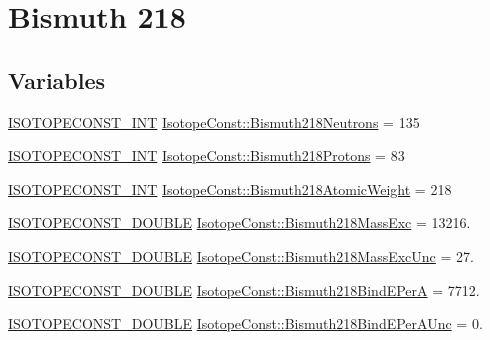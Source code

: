 \hypertarget{group___isotope_const-_bismuth-_bi218}{}\section{Bismuth 218}
\label{group___isotope_const-_bismuth-_bi218}
\subsection*{Variables}
\begin{DoxyCompactItemize}
\item 
\mbox{\hyperlink{group___isotope_const-_macros_ga5f18360b3e99483a35c32d789e62621c}{I\+S\+O\+T\+O\+P\+E\+C\+O\+N\+S\+T\+\_\+\+I\+NT}} \mbox{\hyperlink{group___isotope_const-_bismuth-_bi218_ga3a7dd1d83a43975898d46192b9614994}{Isotope\+Const\+::\+Bismuth218\+Neutrons}} = 135
\item 
\mbox{\hyperlink{group___isotope_const-_macros_ga5f18360b3e99483a35c32d789e62621c}{I\+S\+O\+T\+O\+P\+E\+C\+O\+N\+S\+T\+\_\+\+I\+NT}} \mbox{\hyperlink{group___isotope_const-_bismuth-_bi218_ga99e855b494cd6569161abd1d37eeb29c}{Isotope\+Const\+::\+Bismuth218\+Protons}} = 83
\item 
\mbox{\hyperlink{group___isotope_const-_macros_ga5f18360b3e99483a35c32d789e62621c}{I\+S\+O\+T\+O\+P\+E\+C\+O\+N\+S\+T\+\_\+\+I\+NT}} \mbox{\hyperlink{group___isotope_const-_bismuth-_bi218_ga82c41bd63224026872a147982b7467b9}{Isotope\+Const\+::\+Bismuth218\+Atomic\+Weight}} = 218
\item 
\mbox{\hyperlink{group___isotope_const-_macros_ga8f45a7272ce02c0b4c65c44636ed719a}{I\+S\+O\+T\+O\+P\+E\+C\+O\+N\+S\+T\+\_\+\+D\+O\+U\+B\+LE}} \mbox{\hyperlink{group___isotope_const-_bismuth-_bi218_ga25d8012733a8e12573b42ecfd4c5728d}{Isotope\+Const\+::\+Bismuth218\+Mass\+Exc}} = 13216.
\item 
\mbox{\hyperlink{group___isotope_const-_macros_ga8f45a7272ce02c0b4c65c44636ed719a}{I\+S\+O\+T\+O\+P\+E\+C\+O\+N\+S\+T\+\_\+\+D\+O\+U\+B\+LE}} \mbox{\hyperlink{group___isotope_const-_bismuth-_bi218_ga4d3baf2e524adeb05322dc3b745c0e20}{Isotope\+Const\+::\+Bismuth218\+Mass\+Exc\+Unc}} = 27.
\item 
\mbox{\hyperlink{group___isotope_const-_macros_ga8f45a7272ce02c0b4c65c44636ed719a}{I\+S\+O\+T\+O\+P\+E\+C\+O\+N\+S\+T\+\_\+\+D\+O\+U\+B\+LE}} \mbox{\hyperlink{group___isotope_const-_bismuth-_bi218_ga2d0d65d8119471e1149da3408f01f0f0}{Isotope\+Const\+::\+Bismuth218\+Bind\+E\+PerA}} = 7712.
\item 
\mbox{\hyperlink{group___isotope_const-_macros_ga8f45a7272ce02c0b4c65c44636ed719a}{I\+S\+O\+T\+O\+P\+E\+C\+O\+N\+S\+T\+\_\+\+D\+O\+U\+B\+LE}} \mbox{\hyperlink{group___isotope_const-_bismuth-_bi218_gadd2cd234f19b22cdae732834dfac6bea}{Isotope\+Const\+::\+Bismuth218\+Bind\+E\+Per\+A\+Unc}} = 0.

\end{DoxyCompactItemize}

